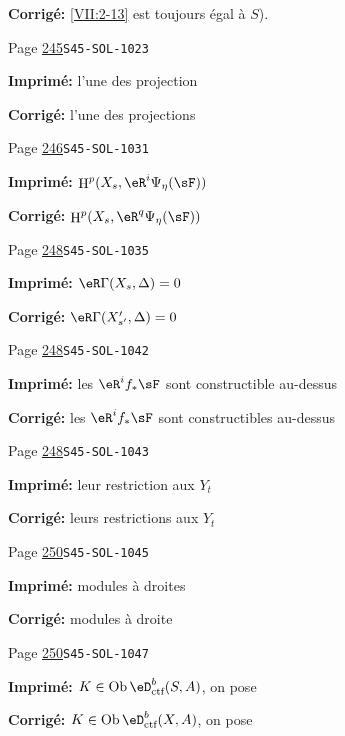\documentclass[oneside]{book}
\DeclareMathOperator{\h}{H}
\DeclareMathOperator{\ob}{Ob}
\theoremstyle{sga-source}
\theoremstyle{sga-source-dash}
\theoremstyle{sga-source-dotdash}
\theoremstyle{sga-source-number-note-dash}
\theoremstyle{sga-source-note-number-dotdash}
\theoremstyle{sga-source-example-dotdash}
\theoremstyle{sga-source-inline-number}
\theoremstyle{sga-source-bare-number}
\theoremstyle{sga-source}
\begin{document}
\begin{description}
\par\noindent\textbf{Corrigé:} \ref{VII:2-13} est toujours égal à $S$).
\smallskip
\item[\hypertarget{apparatus:FR-0256}{256}] Page \hyperlink{printpage:fr:245}{245}\quad\texttt{S45-SOL-1023}
\par\noindent\textbf{Imprimé:} l'une des projection 
\par\noindent\textbf{Corrigé:} l'une des projections 
\smallskip
\item[\hypertarget{apparatus:FR-0257}{257}] Page \hyperlink{printpage:fr:246}{246}\quad\texttt{S45-SOL-1031}
\par\noindent\textbf{Imprimé:} \(\h^p(X_s,\eR^i\Psi_\eta(\sF))\)
\par\noindent\textbf{Corrigé:} \(\h^p(X_s,\eR^q\Psi_\eta(\sF))\)
\smallskip
\item[\hypertarget{apparatus:FR-0258}{258}] Page \hyperlink{printpage:fr:248}{248}\quad\texttt{S45-SOL-1035}
\par\noindent\textbf{Imprimé:} $\eR\Gamma(X_s,\Delta)=0$
\par\noindent\textbf{Corrigé:} $\eR\Gamma(X_{s'}',\Delta)=0$
\smallskip
\item[\hypertarget{apparatus:FR-0259}{259}] Page \hyperlink{printpage:fr:248}{248}\quad\texttt{S45-SOL-1042}
\par\noindent\textbf{Imprimé:} les $\eR^i f_\ast \sF$ sont constructible au-dessus
\par\noindent\textbf{Corrigé:} les $\eR^i f_\ast \sF$ sont constructibles au-dessus
\smallskip
\item[\hypertarget{apparatus:FR-0260}{260}] Page \hyperlink{printpage:fr:248}{248}\quad\texttt{S45-SOL-1043}
\par\noindent\textbf{Imprimé:} leur restriction 
aux $Y_t$
\par\noindent\textbf{Corrigé:} leurs restrictions 
aux $Y_t$
\smallskip
\item[\hypertarget{apparatus:FR-0261}{261}] Page \hyperlink{printpage:fr:250}{250}\quad\texttt{S45-SOL-1045}
\par\noindent\textbf{Imprimé:} modules à droites
\par\noindent\textbf{Corrigé:} modules à droite
\smallskip
\item[\hypertarget{apparatus:FR-0262}{262}] Page \hyperlink{printpage:fr:250}{250}\quad\texttt{S45-SOL-1047}
\par\noindent\textbf{Imprimé:} $K\in\ob\eD_\text{ctf}^b(S,A)$, on pose
\par\noindent\textbf{Corrigé:} $K\in\ob\eD_\text{ctf}^b(X,A)$, on pose

\end{description}
\end{document}
